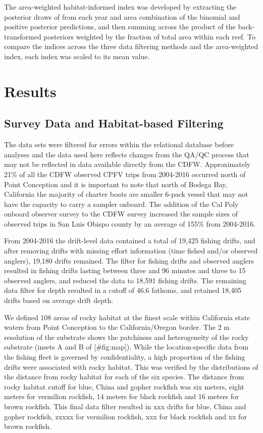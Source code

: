\documentclass[
  12pt,
  authoryear,
  preprint,
  3p]{elsarticle}
\begin{document}
The area-weighted habitat-informed index was developed by extracting the
posterior draws of from each year and area combination of the binomial
and positive posterior predictions, and then summing across the product
of the back-transformed posteriors weighted by the fraction of total
area within each reef. To compare the indices across the three data
filtering methods and the area-weighted index, each index was scaled to
its mean value.

\hypertarget{results}{%
\section{Results}\label{results}}

\hypertarget{survey-data-and-habitat-based-filtering-1}{%
\subsection{Survey Data and Habitat-based
Filtering}\label{survey-data-and-habitat-based-filtering-1}}

The data sets were filtered for errors within the relational database
before analyses and the data used here reflects changes from the QA/QC
process that may not be reflected in data available directly from the
CDFW. Approximately 21\% of all the CDFW observed CPFV trips from
2004-2016 occurred north of Point Conception and it is important to note
that north of Bodega Bay, California the majority of charter boats are
smaller 6-pack vessel that may not have the capacity to carry a sampler
onboard. The addition of the Cal Poly onboard observer survey to the
CDFW survey increased the sample sizes of observed trips in San Luis
Obispo county by an average of 155\% from 2004-2016.

From 2004-2016 the drift-level data contained a total of 19,425 fishing
drifts, and after removing drifts with missing effort information (time
fished and/or observed anglers), 19,180 drifts remained. The filter for
fishing drifts and observed anglers resulted in fishing drifts lasting
between three and 96 minutes and three to 15 observed anglers, and
reduced the data to 18,591 fishing drifts. The remaining data filter for
depth resulted in a cutoff of 46.6 fathoms, and retained 18,405 drifts
based on average drift depth.

We defined 108 areas of rocky habitat at the finest scale within
California state waters from Point Conception to the California/Oregon
border. The 2 m resolution of the substrate shows the patchiness and
heterogeneity of the rocky substrate (insets A and B of
{[}\#fig:map{]}). While the location-specific data from the fishing
fleet is governed by confidentiality, a high proportion of the fishing
drifts were associated with rocky habitat. This was verified by the
distributions of the distance from rocky habitat for each of the six
species. The distance from rocky habitat cutoff for blue, China and
gopher rockfish was six meters, eight meters for vermilion rockfish, 14
meters for black rockfish and 16 meters for brown rockfish. This final
data filter resulted in xxx drifts for blue, China and gopher rockfish,
zxxxx for vermilion rockfish, xxx for black rockfish and xx for brown
rockfish.
\end{document}
